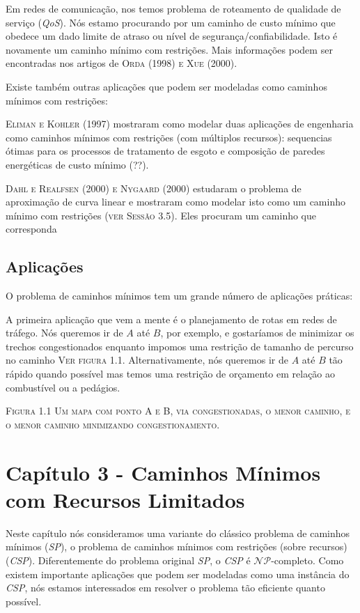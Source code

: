 \documentclass[10pt,a4paper]{article}
\begin{document}
Em redes de comunicação, nos temos problema de roteamento de qualidade 
de serviço (\emph{QoS}). Nós estamo procurando por um caminho de custo 
mínimo que obedece um dado limite de atraso ou nível de 
segurança/confiabilidade. Isto é novamente um caminho mínimo com 
restrições. Mais informações podem ser encontradas nos artigos de 
\textsc{Orda (1998) e Xue (2000)}.

Existe também outras aplicações que podem ser modeladas como caminhos 
mínimos com restrições:

\textsc{Eliman e Kohler (1997)} mostraram como modelar duas aplicações 
de engenharia como caminhos mínimos com restrições (com múltiplos 
recursos): sequencias ótimas para os processos de tratamento de esgoto e 
composição de paredes energéticas de custo mínimo (??).

\textsc{Dahl e Realfsen (2000) e Nygaard (2000)} estudaram o problema de 
aproximação de curva linear e mostraram como modelar isto como um 
caminho mínimo com restrições (\textsc{ver Sessão 3.5}). Eles procuram 
um caminho que corresponda %

\subsection{Aplicações}

O problema de caminhos mínimos tem um grande número de aplicações 
práticas:

A primeira aplicação que vem a mente é o planejamento de rotas em redes 
de tráfego. Nós queremos ir de $A$ até $B$, por exemplo, e gostaríamos 
de minimizar os trechos congestionados enquanto impomos uma restrição de 
tamanho de percurso no caminho \textsc{Ver figura 1.1}.  
Alternativamente, nós queremos ir de $A$ até $B$ tão rápido quando 
possível mas temos uma restrição de orçamento em relação ao combustível 
ou a pedágios.

\textsc{Figura 1.1 Um mapa com ponto A e B, via congestionadas, o menor 
caminho, e o menor caminho minimizando congestionamento.}

\section{Capítulo 3 - Caminhos Mínimos com Recursos Limitados}

Neste capítulo nós consideramos uma variante do clássico problema de 
caminhos mínimos (\emph{SP}), o problema de caminhos mínimos com 
restrições (sobre recursos) (\emph{CSP}). Diferentemente do problema 
original \emph{SP}, o \emph{CSP} é $\mathcal{NP}$-completo. Como existem 
importante aplicações que podem ser modeladas como uma instância do 
\emph{CSP}, nós estamos interessados em resolver o problema tão 
eficiente quanto possível.
\end{document}
